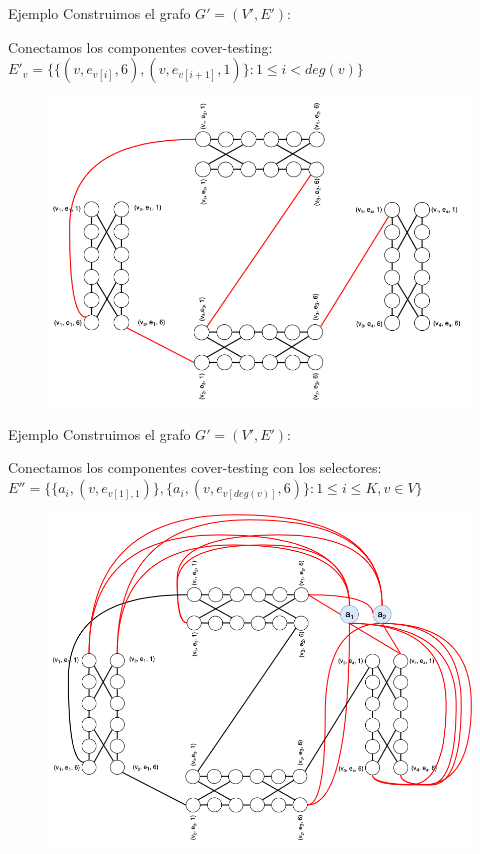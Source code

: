 \documentclass{beamer}
\begin{document}
\begin{frame}{Ejemplo}
    Construimos el grafo $G' = (V', E')$:
    \begin{block}{}
        Conectamos los componentes cover-testing: $E'_v = \{\{(v, e_{v[i]}, 6), (v, e_{v[i+1]},1)\} : 1 \le i < deg(v)\}$
    \end{block}
    \begin{figure}
        \centering
        \includegraphics[scale=0.23]{images/example-4.png}
    \end{figure}
\end{frame}

\begin{frame}{Ejemplo}
    Construimos el grafo $G' = (V', E')$:
    \begin{block}{}
        Conectamos los componentes cover-testing con los selectores:
        $E'' = \{\{a_i, (v,e_{v[1], 1})\},\{a_i, (v,e_{v[deg(v)]}, 6)\} : 1 \le i \le K, v \in V \}$
    \end{block}
    \begin{figure}
        \centering
        \includegraphics[scale=0.23]{images/example-5.png}
    \end{figure}
\end{frame}
\end{document}
